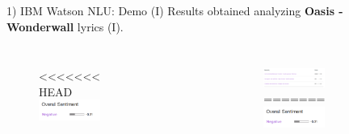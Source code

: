 \documentclass[xcolor=dvipsnames]{beamer}
\begin{document}
\begin{frame}{1) IBM Watson NLU: Demo (I)}
Results obtained analyzing \textbf{Oasis - Wonderwall} lyrics (I).
\begin{columns}
\begin{figure}
<<<<<<< HEAD
	\includegraphics[scale=0.3,left]{./images/sentiment}
\end{figure}
\begin{figure}
	\includegraphics[scale=0.3,left]{./images/emotion}
\end{figure}
\begin{figure}
	\includegraphics[scale=0.3,left]{./images/categories}
=======
	\includegraphics[scale=0.3]{./images/sentiment}
\end{figure}
\begin{figure}
	\includegraphics[scale=0.3]{./images/emotion}
\end{figure}

\end{columns}
\end{frame}
\end{document}
